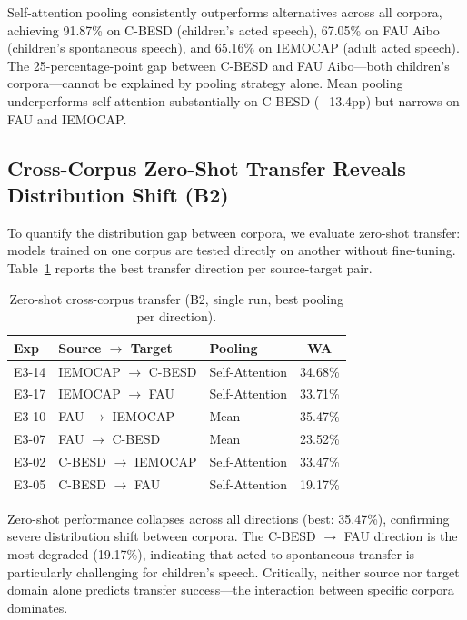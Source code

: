 Self-attention pooling consistently outperforms alternatives across all corpora, achieving 91.87\% on C-BESD (children's acted speech), 67.05\% on FAU Aibo (children's spontaneous speech), and 65.16\% on IEMOCAP (adult acted speech). The 25-percentage-point gap between C-BESD and FAU Aibo---both children's corpora---cannot be explained by pooling strategy alone. Mean pooling underperforms self-attention substantially on C-BESD ($-$13.4pp) but narrows on FAU and IEMOCAP.

\subsection{Cross-Corpus Zero-Shot Transfer Reveals Distribution Shift (B2)}

To quantify the distribution gap between corpora, we evaluate zero-shot transfer: models trained on one corpus are tested directly on another without fine-tuning. Table~\ref{tab:b2} reports the best transfer direction per source-target pair.

\begin{table}[h]
\centering
\caption{Zero-shot cross-corpus transfer (B2, single run, best pooling per direction).}
\label{tab:b2}
\begin{tabular}{lllc}
\toprule
\textbf{Exp} & \textbf{Source $\rightarrow$ Target} & \textbf{Pooling} & \textbf{WA} \\
\midrule
E3-14 & IEMOCAP $\rightarrow$ C-BESD  & Self-Attention & 34.68\% \\
E3-17 & IEMOCAP $\rightarrow$ FAU     & Self-Attention & 33.71\% \\
E3-10 & FAU $\rightarrow$ IEMOCAP     & Mean           & 35.47\% \\
E3-07 & FAU $\rightarrow$ C-BESD      & Mean           & 23.52\% \\
E3-02 & C-BESD $\rightarrow$ IEMOCAP  & Self-Attention & 33.47\% \\
E3-05 & C-BESD $\rightarrow$ FAU      & Self-Attention & 19.17\% \\
\bottomrule
\end{tabular}
\end{table}

Zero-shot performance collapses across all directions (best: 35.47\%), confirming severe distribution shift between corpora. The C-BESD $\rightarrow$ FAU direction is the most degraded (19.17\%), indicating that acted-to-spontaneous transfer is particularly challenging for children's speech. Critically, neither source nor target domain alone predicts transfer success---the interaction between specific corpora dominates.

